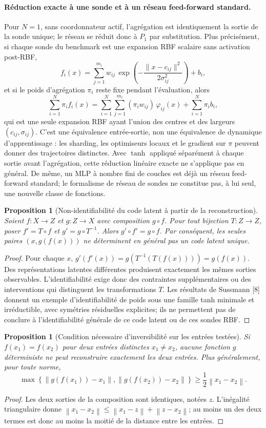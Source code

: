 \documentclass[11pt,a4paper]{article}
\newtheorem{proposition}[definition]{Proposition}
\newcommand{\norm}[1]{\left\lVert#1\right\rVert}
\begin{document}
\paragraph{Réduction exacte à une sonde et à un réseau feed-forward standard.}
Pour $N=1$, sans coordonnateur actif, l'agrégation est identiquement la sortie de la sonde unique; le réseau se réduit donc à $P_1$ par substitution. Plus précisément, si chaque sonde du benchmark est une expansion RBF scalaire sans activation post-RBF,
\[
f_i(x)=\sum_{j=1}^{m_i} w_{ij}\,\exp\!\left(-\frac{\|x-c_{ij}\|^2}{2\sigma_{ij}^2}\right)+b_i,
\]
et si le poids d'agrégation $\pi_i$ reste fixe pendant l'évaluation, alors
\[
\sum_{i=1}^N\pi_i f_i(x)=\sum_{i=1}^N\sum_{j=1}^{m_i}(\pi_iw_{ij})\,\varphi_{ij}(x)+\sum_{i=1}^N\pi_i b_i,
\]
qui est une seule expansion RBF ayant l'union des centres et des largeurs $(c_{ij},\sigma_{ij})$. C'est une équivalence entrée-sortie, non une équivalence de dynamique d'apprentissage : les sharding, les optimiseurs locaux et le gradient sur $\pi$ peuvent donner des trajectoires distinctes. Avec $\tanh$ appliqué séparément à chaque sortie avant l'agrégation, cette réduction linéaire exacte ne s'applique pas en général. De même, un MLP à nombre fini de couches est déjà un réseau feed-forward standard; le formalisme de réseau de sondes ne constitue pas, à lui seul, une nouvelle classe de fonctions.

\begin{proposition}[Non-identifiabilité du code latent à partir de la reconstruction]
Soient $f:X\to Z$ et $g:Z\to X$ avec composition $g\circ f$. Pour tout bijection $T:Z\to Z$, poser $f'=T\circ f$ et $g'=g\circ T^{-1}$. Alors $g'\circ f'=g\circ f$. Par conséquent, les seules paires $(x,g(f(x)))$ ne déterminent en général pas un code latent unique.
\end{proposition}
\begin{proof}
Pour chaque $x$, $g'(f'(x))=g(T^{-1}(T(f(x))))=g(f(x))$. Des représentations latentes différentes produisent exactement les mêmes sorties observables. L'identifiabilité exige donc des contraintes supplémentaires ou des interventions qui distinguent les transformations $T$. Les résultats de Sussmann [8] donnent un exemple d'identifiabilité de poids sous une famille tanh minimale et irréductible, avec symétries résiduelles explicites; ils ne permettent pas de conclure à l'identifiabilité générale de ce code latent ou de ces sondes RBF.
\end{proof}

\begin{proposition}[Condition nécessaire d'inversibilité sur les entrées testées]
Si $f(x_1)=f(x_2)$ pour deux entrées distinctes $x_1\ne x_2$, aucune fonction $g$ déterministe ne peut reconstruire exactement les deux entrées. Plus généralement, pour toute norme,
\[
\max\left\{\norm{g(f(x_1))-x_1},\norm{g(f(x_2))-x_2}\right\}\geq\frac12\norm{x_1-x_2}.
\]
\end{proposition}
\begin{proof}
Les deux sorties de la composition sont identiques, notées $z$. L'inégalité triangulaire donne $\norm{x_1-x_2}\leq\norm{x_1-z}+\norm{z-x_2}$; au moins un des deux termes est donc au moins la moitié de la distance entre les entrées.
\end{proof}
\end{document}
